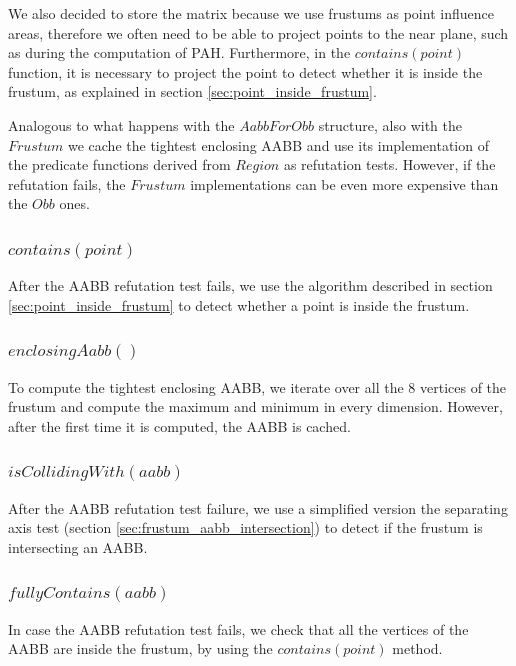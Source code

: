 \documentclass{PoliMi_MasterThesis}
\begin{document}
We also decided to store the matrix because we use frustums as point influence areas, therefore we often need to be able to project points to the near plane, such as during the computation of PAH. Furthermore, in the $contains(point)$ function, it is necessary to project the point to detect whether it is inside the frustum, as explained in section \ref{sec:point_inside_frustum}.

Analogous to what happens with the $AabbForObb$ structure, also with the $Frustum$ we cache the tightest enclosing AABB and use its implementation of the predicate functions derived from $Region$ as refutation tests. However, if the refutation fails, the $Frustum$ implementations can be even more expensive than the $Obb$ ones.

\subsubsection*{$contains(point)$}
After the AABB refutation test fails, we use the algorithm described in section \ref{sec:point_inside_frustum} to detect whether a point is inside the frustum.

\subsubsection*{$enclosingAabb()$}
To compute the tightest enclosing AABB, we iterate over all the 8 vertices of the frustum and compute the maximum and minimum in every dimension. However, after the first time it is computed, the AABB is cached.

\subsubsection*{$isCollidingWith(aabb)$}
After the AABB refutation test failure, we use a simplified version the separating axis test (section \ref{sec:frustum_aabb_intersection}) to detect if the frustum is intersecting an AABB.

\subsubsection*{$fullyContains(aabb)$}
In case the AABB refutation test fails, we check that all the vertices of the AABB are inside the frustum, by using the $contains(point)$ method.
\end{document}

